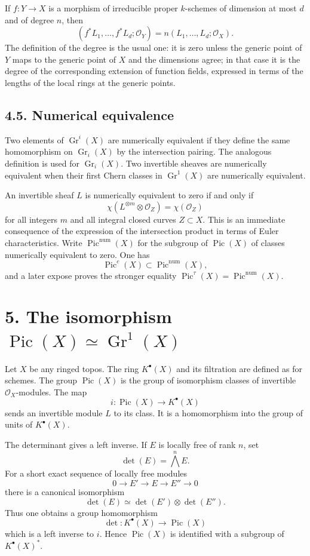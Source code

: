 \documentclass[12pt]{article}
\newcommand{\cO}{\mathcal O}
\newcommand{\Pic}{\operatorname{Pic}}
\newcommand{\Gr}{\operatorname{Gr}}
\newcommand{\detm}{\det}
\newcommand{\longto}{\longrightarrow}
\begin{document}
If $f:Y\to X$ is a morphism of irreducible proper $k$-schemes of dimension at most $d$ and of degree $n$, then
\[
(f^*L_1,\ldots,f^*L_d;\cO_Y)=n(L_1,\ldots,L_d;\cO_X).
\]
The definition of the degree is the usual one: it is zero unless the generic point of $Y$ maps to the generic point of $X$ and the dimensions agree; in that case it is the degree of the corresponding extension of function fields, expressed in terms of the lengths of the local rings at the generic points.

\subsection*{4.5. Numerical equivalence}

Two elements of $\Gr^i(X)$ are numerically equivalent if they define the same homomorphism on $\Gr_i(X)$ by the intersection pairing. The analogous definition is used for $\Gr_i(X)$. Two invertible sheaves are numerically equivalent when their first Chern classes in $\Gr^1(X)$ are numerically equivalent.

An invertible sheaf $L$ is numerically equivalent to zero if and only if
\[
\chi(L^{\otimes m}\otimes\cO_Z)=\chi(\cO_Z)
\]
for all integers $m$ and all integral closed curves $Z\subset X$. This is an immediate consequence of the expression of the intersection product in terms of Euler characteristics. Write $\Pic^{\mathrm{num}}(X)$ for the subgroup of $\Pic(X)$ of classes numerically equivalent to zero. One has
\[
\Pic^c(X)\subset \Pic^{\mathrm{num}}(X),
\]
and a later expose proves the stronger equality $\Pic^\tau(X)=\Pic^{\mathrm{num}}(X)$.

\section*{5. The isomorphism $\Pic(X)\simeq\Gr^1(X)$}

Let $X$ be any ringed topos. The ring $K^\bullet(X)$ and its filtration are defined as for schemes. The group $\Pic(X)$ is the group of isomorphism classes of invertible $\cO_X$-modules. The map
\[
i:\Pic(X)\longto K^\bullet(X)
\]
sends an invertible module $L$ to its class. It is a homomorphism into the group of units of $K^\bullet(X)$.

The determinant gives a left inverse. If $E$ is locally free of rank $n$, set
\[
\detm(E)=\bigwedge^nE.
\]
For a short exact sequence of locally free modules
\[
0\to E'\to E\to E''\to0
\]
there is a canonical isomorphism
\[
\detm(E)\simeq \detm(E')\otimes\detm(E'').
\]
Thus one obtains a group homomorphism
\[
\detm:K^\bullet(X)\longto\Pic(X)
\]
which is a left inverse to $i$. Hence $\Pic(X)$ is identified with a subgroup of $K^\bullet(X)^*$.
\end{document}
